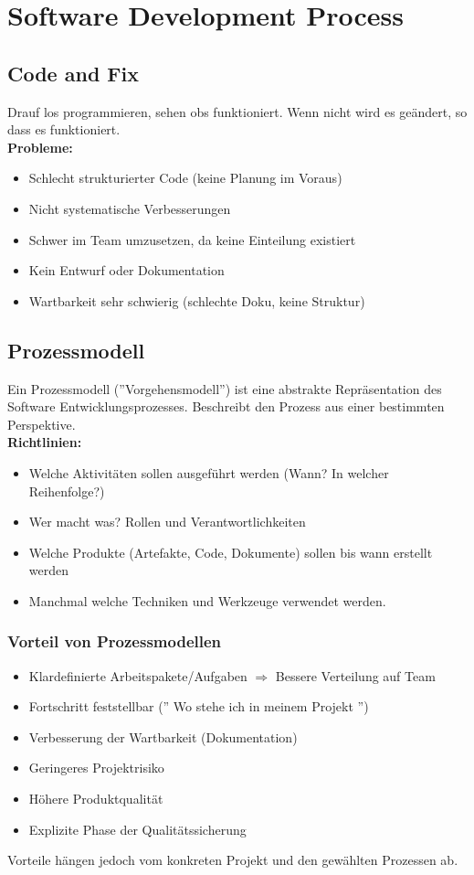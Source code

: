 \chapter{Software Development Process}

\section{Code and Fix}
Drauf los programmieren, sehen obs funktioniert. Wenn nicht wird es geändert,
so dass es funktioniert. \\

\textbf{Probleme:}
\begin{itemize}
    \item Schlecht strukturierter Code (keine Planung im Voraus)
    \item Nicht systematische Verbesserungen
    \item Schwer im Team umzusetzen, da keine Einteilung existiert
    \item Kein Entwurf oder Dokumentation
    \item Wartbarkeit sehr schwierig (schlechte Doku, keine Struktur)
\end{itemize}

\section{Prozessmodell}
Ein Prozessmodell (''Vorgehensmodell'') ist eine abstrakte Repräsentation
des Software Entwicklungsprozesses. Beschreibt den Prozess aus einer bestimmten
Perspektive.\\

\textbf{Richtlinien:}
\begin{itemize}
    \item Welche Aktivitäten sollen ausgeführt werden (Wann? In welcher
    Reihenfolge?)
    \item Wer macht was? Rollen und Verantwortlichkeiten
    \item Welche Produkte (Artefakte, Code, Dokumente) sollen bis wann erstellt
    werden
    \item Manchmal welche Techniken und Werkzeuge verwendet werden.
\end{itemize}
\subsection{Vorteil von Prozessmodellen}
\begin{itemize}
    \item Klardefinierte Arbeitspakete/Aufgaben $\Rightarrow$ Bessere Verteilung
    auf Team
    \item Fortschritt feststellbar ('' Wo stehe ich in meinem Projekt '')
    \item Verbesserung der Wartbarkeit (Dokumentation)
    \item Geringeres Projektrisiko
    \item Höhere Produktqualität
    \item Explizite Phase der Qualitätssicherung
\end{itemize}
Vorteile hängen jedoch vom konkreten Projekt und den gewählten Prozessen ab.


